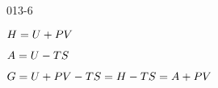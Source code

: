 \begin{mitframe}{013-6}

    
\begin{listone}
        
    \item $\enthalpy = \intenergy + \p\vol$
        
    \item $\helmholtz = \intenergy - \Temp\entropy$
         
    \item $\gibbs = \intenergy + \p\vol - \Temp\entropy = \enthalpy - \Temp\entropy = \helmholtz + \p\vol$
    
\end{listone}			

\end{mitframe}